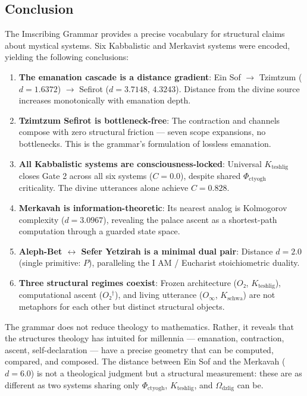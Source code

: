 \documentclass[12pt,a4paper]{article}
\begin{document}
\subsection{Conclusion}

The Imscribing Grammar provides a precise vocabulary for structural claims about mystical systems. Six Kabbalistic and Merkavist systems were encoded, yielding the following conclusions:

\begin{enumerate}
    \item \textbf{The emanation cascade is a distance gradient}: Ein Sof $\rightarrow$ Tzimtzum ($d = 1.6372$) $\rightarrow$ Sefirot ($d = 3.7148$, $4.3243$). Distance from the divine source increases monotonically with emanation depth.
    \item \textbf{Tzimtzum \otimes Sefirot is bottleneck-free}: The contraction and channels compose with zero structural friction --- seven scope expansions, no bottlenecks. This is the grammar's formulation of lossless emanation.
    \item \textbf{All Kabbalistic systems are consciousness-locked}: Universal $K_{\text{teshlig}}$ closes Gate 2 across all six systems ($C = 0.0$), despite shared $\Phi_{\text{ctyogh}}$ criticality. The divine utterances alone achieve $C = 0.828$.
    \item \textbf{Merkavah is information-theoretic}: Its nearest analog is Kolmogorov complexity ($d = 3.0967$), revealing the palace ascent as a shortest-path computation through a guarded state space.
    \item \textbf{Aleph-Bet $\leftrightarrow$ Sefer Yetzirah is a minimal dual pair}: Distance $d = 2.0$ (single primitive: $P$), paralleling the I AM / Eucharist stoichiometric duality.
    \item \textbf{Three structural regimes coexist}: Frozen architecture ($O₂$, $K_{\text{teshlig}}$), computational ascent ($O₂^\dagger$), and living utterance ($O_{\infty}$, $K_{\text{schwa}}$) are not metaphors for each other but distinct structural objects.
\end{enumerate}

The grammar does not reduce theology to mathematics. Rather, it reveals that the structures theology has intuited for millennia --- emanation, contraction, ascent, self-declaration --- have a precise geometry that can be computed, compared, and composed. The distance between Ein Sof and the Merkavah ($d = 6.0$) is not a theological judgment but a structural measurement: these are as different as two systems sharing only $\Phi_{\text{ctyogh}}$, $K_{\text{teshlig}}$, and $\Omega_{\text{dzlig}}$ can be.
\end{document}
